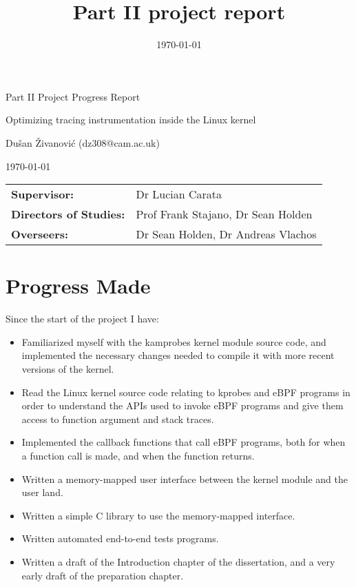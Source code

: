 \documentclass[12pt, A4]{article}
\title{Part II project report}
\date{\today}
\begin{document}
    \centerline{\large Part II Project Progress Report}
    \vspace{4mm}
    \centerline{\Large Optimizing tracing instrumentation inside the Linux kernel}
    \vspace{4mm}
    \centerline{\large Dušan Živanović (dz308@cam.ac.uk)}
    \vspace{4mm}
    \centerline{\large \today}
    \vspace{10mm}
    
    \hspace{-9mm}
    \begin{tabular}{l l}
        \bf{Supervisor:} & Dr Lucian Carata \\
        \bf{Directors of Studies:} & Prof Frank Stajano, Dr Sean Holden \\
        \bf{Overseers:} & Dr Sean Holden, Dr Andreas Vlachos \\
    \end{tabular}

    \section{Progress Made}
        Since the start of the project I have:
        \begin{itemize}
            \item Familiarized myself with the kamprobes kernel module source code, and implemented the necessary changes needed to compile it with more recent versions of the kernel.
            \item Read the Linux kernel source code relating to kprobes and eBPF programs in order to understand the APIs used to invoke eBPF programs and give them access to function argument and stack traces.
            \item Implemented the callback functions that call eBPF programs, both for when a function call is made, and when the function returns.
            \item Written a memory-mapped user interface between the kernel module and the user land.
            \item Written a simple C library to use the memory-mapped interface.
            \item Written automated end-to-end tests programs.
            \item Written a draft of the Introduction chapter of the dissertation, and a very early draft of the preparation chapter.
        \end{itemize}
\end{document}
